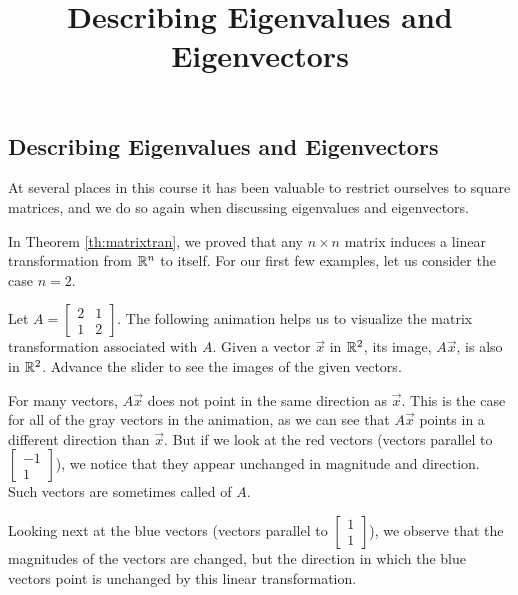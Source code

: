 \documentclass{ximera}
\title{Describing Eigenvalues and Eigenvectors} \license{CC BY-NC-SA 4.0}
\begin{document}
\begin{abstract}

\end{abstract}
\maketitle

\begin{onlineOnly}
\section*{Describing Eigenvalues and Eigenvectors}
\end{onlineOnly}

At several places in this course it has been valuable to restrict ourselves to square matrices, and we do so again when discussing eigenvalues and eigenvectors.  

In Theorem \ref{th:matrixtran}, we proved that any $n \times n$  matrix induces a linear transformation from $\mathbb{R}^n$ to itself.  For our first few examples, let us consider the case $n = 2$. 

\begin{exploration}\label{init:eignintro}
Let $A=\begin{bmatrix} 2& 1\\ 1&2
\end{bmatrix}$.  The following animation helps us to visualize the matrix transformation associated with $A$.  Given a vector $\vec{x}$ in $\mathbb{R}^2$, its image, $A\vec{x}$, is also in $\mathbb{R}^2$.  Advance the slider to see the images of the given vectors.


\begin{onlineOnly}
\begin{center}
  \end{center}
  \end{onlineOnly}

  For many vectors, $A\vec{x}$ does not point in the same direction as $\vec{x}$.  This is the case for all of the gray vectors in the animation, as we can see that $A\vec{x}$ points in a different direction than $\vec{x}$.  But if we look at the red vectors (vectors parallel to $\begin{bmatrix}-1\\1\end{bmatrix}$), we notice that they appear unchanged in magnitude and direction.  Such vectors are sometimes called  of $A$.

Looking next at the blue vectors (vectors parallel to $\begin{bmatrix}1\\1\end{bmatrix}$), we observe that the magnitudes of the vectors are changed, but the direction in which the blue vectors point is unchanged by this linear transformation.  
\end{exploration}
\end{document}
